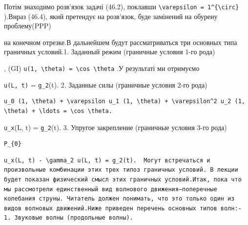 \documentclass[
  ukrainian,
]{article}
\begin{document}
Потім знаходимо розв'язок задачі (46.2), поклавши
\texttt{\textbackslash{}varepsilon\ =\ 1\^{}\{\textbackslash{}circ\}}
).Вираз (46.4), який претендує на розв'язок, буде замінений на обурену
проблему(PPP)

на конечном отрезке.В дальнейшем будут рассматриваться три основных типа
граничных условий.1. Заданный режим (граничные условия 1-го рода)

, (GI)
\texttt{u(1,\ \textbackslash{}theta)\ =\ \textbackslash{}cos\ \textbackslash{}theta}
.У результаті ми отримуємо

\texttt{u(L,\ t)} = \texttt{g\_2}(t). 2. Заданные силы (граничные
условия 2-го рода)

\begin{verbatim}
u_0 (1, \theta) + \varepsilon u_1 (1, \theta) + \varepsilon^2 u_2 (1, \theta) + \ldots = \cos \theta.
\end{verbatim}

\texttt{u\_x}(L, t) = \texttt{g\_2}(t). 3. Упругое закрепление
(граничные условия 3-го рода)

\begin{verbatim}
P_{0}
\end{verbatim}

\begin{verbatim}
u_x(L, t) - \gamma_2 u(L, t) = g_2(t).  Могут встречаться и произвольные комбинации этих трех типоз граничных условий. В лекции будет показан физический смысл этих граничных условий.Итак, пока что мы рассмотрели единственный вид волнового движения—поперечные колебания струны. Читатель должен понимать, что это только один из видов волновых движений.Ниже приведен перечень основных типов волн:- 1. Звуковые волны (продольные волны).
\end{verbatim}
\end{document}
